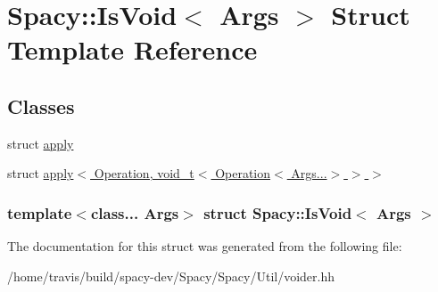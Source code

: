 \hypertarget{structSpacy_1_1IsVoid}{\section{\-Spacy\-:\-:\-Is\-Void$<$ \-Args $>$ \-Struct \-Template \-Reference}
\label{structSpacy_1_1IsVoid}
}
\subsection*{\-Classes}
\begin{DoxyCompactItemize}
\item 
struct \hyperlink{structSpacy_1_1IsVoid_1_1apply}{apply}
\item 
struct \hyperlink{structSpacy_1_1IsVoid_1_1apply_3_01Operation_00_01void__t_3_01Operation_3_01Args_8_8_8_4_01_4_01_4}{apply$<$ Operation, void\-\_\-t$<$ Operation$<$ Args...$>$ $>$ $>$}
\end{DoxyCompactItemize}
\subsubsection*{template$<$class... \-Args$>$ struct Spacy\-::\-Is\-Void$<$ Args $>$}



\-The documentation for this struct was generated from the following file\-:\begin{DoxyCompactItemize}
\item 
/home/travis/build/spacy-\/dev/\-Spacy/\-Spacy/\-Util/voider.\-hh\end{DoxyCompactItemize}
